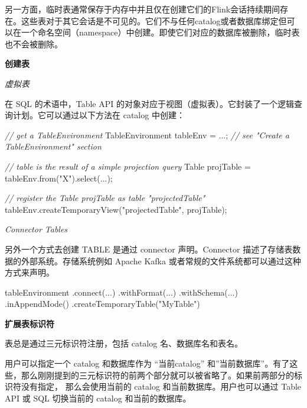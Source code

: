 \documentclass[cn,11pt,chinese]{elegantbook}
\newenvironment{Shaded}{}{}
\newcommand{\CommentTok}[1]{\textcolor[rgb]{0.38,0.63,0.69}{\textit{#1}}}
\newcommand{\FunctionTok}[1]{\textcolor[rgb]{0.02,0.16,0.49}{#1}}
\newcommand{\NormalTok}[1]{#1}
\newcommand{\StringTok}[1]{\textcolor[rgb]{0.25,0.44,0.63}{#1}}
\begin{document}
另一方面，临时表通常保存于内存中并且仅在创建它们的Flink会话持续期间存在。这些表对于其它会话是不可见的。它们不与任何catalog或者数据库绑定但可以在一个命名空间（namespace）中创建。即使它们对应的数据库被删除，临时表也不会被删除。

\textbf{创建表}

\emph{虚拟表}

在 SQL 的术语中，Table API
的对象对应于视图（虚拟表）。它封装了一个逻辑查询计划。它可以通过以下方法在
catalog 中创建：

\begin{Shaded}
\begin{Highlighting}[]
\CommentTok{// get a TableEnvironment}
\NormalTok{TableEnvironment tableEnv = ...; }\CommentTok{// see "Create a TableEnvironment" section}

\CommentTok{// table is the result of a simple projection query }
\NormalTok{Table projTable = tableEnv.}\FunctionTok{from}\NormalTok{(}\StringTok{"X"}\NormalTok{).}\FunctionTok{select}\NormalTok{(...);}

\CommentTok{// register the Table projTable as table "projectedTable"}
\NormalTok{tableEnv.}\FunctionTok{createTemporaryView}\NormalTok{(}\StringTok{"projectedTable"}\NormalTok{, projTable);}
\end{Highlighting}
\end{Shaded}

\emph{Connector Tables}

另外一个方式去创建 TABLE 是通过 connector 声明。Connector
描述了存储表数据的外部系统。存储系统例如 Apache Kafka
或者常规的文件系统都可以通过这种方式来声明。

\begin{Shaded}
\begin{Highlighting}[]
\NormalTok{tableEnvironment}
\NormalTok{    .}\FunctionTok{connect}\NormalTok{(...)}
\NormalTok{    .}\FunctionTok{withFormat}\NormalTok{(...)}
\NormalTok{    .}\FunctionTok{withSchema}\NormalTok{(...)}
\NormalTok{    .}\FunctionTok{inAppendMode}\NormalTok{()}
\NormalTok{    .}\FunctionTok{createTemporaryTable}\NormalTok{(}\StringTok{"MyTable"}\NormalTok{)}
\end{Highlighting}
\end{Shaded}

\textbf{扩展表标识符}

表总是通过三元标识符注册，包括 catalog 名、数据库名和表名。

用户可以指定一个 catalog 和数据库作为 ``当前catalog''
和''当前数据库''。有了这些，那么刚刚提到的三元标识符的前两个部分就可以被省略了。如果前两部分的标识符没有指定，
那么会使用当前的 catalog 和当前数据库。用户也可以通过 Table API 或 SQL
切换当前的 catalog 和当前的数据库。
\end{document}
